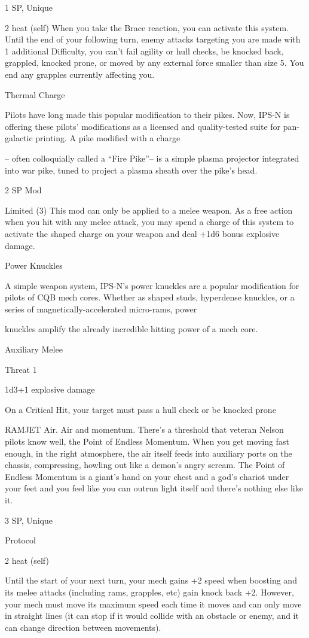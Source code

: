 1 SP, Unique

2 heat (self)
When you take the Brace reaction, you can activate this system. Until the end of your following
turn, enemy attacks targeting you are made with 1 additional Difficulty, you can’t fail agility or hull
checks, be knocked back, grappled, knocked prone, or moved by any external force smaller
than size 5. You end any grapples currently affecting you.


Thermal Charge

Pilots have long made this popular modification to their pikes. Now, IPS-N is offering these pilots’
modifications as a licensed and quality-tested suite for pan-galactic printing. A pike modified with a charge

-- often colloquially called a “Fire Pike”-- is a simple plasma projector integrated into war pike, tuned to
project a plasma sheath over the pike’s head.




2 SP
Mod

Limited (3)
This mod can only be applied to a melee weapon. As a free action when you hit with any melee
attack, you may spend a charge of this system to activate the shaped charge on your weapon
and deal +1d6 bonus explosive damage.


Power Knuckles

A simple weapon system, IPS-N’s power knuckles are a popular modification for pilots of CQB mech cores.
Whether as shaped studs, hyperdense knuckles, or a series of magnetically-accelerated micro-rams, power

knuckles amplify the already incredible hitting power of a mech core.

Auxiliary Melee

Threat 1

1d3+1 explosive damage

On a Critical Hit, your target must pass a hull check or be knocked prone


RAMJET
Air. Air and momentum. There’s a threshold that veteran Nelson pilots know well, the Point of Endless
Momentum. When you get moving fast enough, in the right atmosphere, the air itself feeds into auxiliary
ports on the chassis, compressing, howling out like a demon’s angry scream. The Point of Endless
Momentum is a giant’s hand on your chest and a god’s chariot under your feet and you feel like you can
outrun light itself and there’s nothing else like it.

3 SP, Unique

Protocol

2 heat (self)

Until the start of your next turn, your mech gains +2 speed when boosting and its melee attacks
(including rams, grapples, etc) gain knock back +2. However, your mech must move its
maximum speed each time it moves and can only move in straight lines (it can stop if it would
collide with an obstacle or enemy, and it can change direction between movements).

